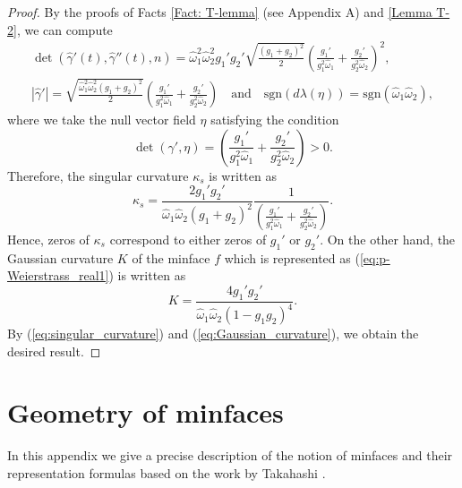 \documentclass[11pt,reqno]{amsart}
\theoremstyle{plain} %
\theoremstyle{definition}
\begin{document}
\begin{proof}
By the proofs of Facts \ref{Fact: T-lemma} (see Appendix A) and \ref{Lemma T-2}, we can compute
\begin{align}
\det(\hat{\gamma}'(t),\hat{\gamma}''(t),n)=\hat{\omega}_1^2\hat{\omega}_2^2g_1'g_2'\sqrt{\frac{(g_1+g_2)^2}{2}} \left(\frac{g_1'}{g_1^2\hat{\omega}_1}+\frac{g_2'}{g_2^2\hat{\omega}_2}\right)^2, \nonumber \\
|\hat{\gamma}'|=\sqrt{\frac{\hat{\omega}_1^2\hat{\omega}_2^2(g_1+g_2)^2}{2}}\left(\frac{g_1'}{g_1^2\hat{\omega}_1}+\frac{g_2'}{g_2^2\hat{\omega}_2}\right)\quad \text{and}\quad \mathrm{sgn}(d\lambda(\eta))=\mathrm{sgn}(\hat{\omega}_1\hat{\omega}_2),\nonumber
\end{align}
where we take the null vector field $\eta$ satisfying the condition
\begin{equation*}
\det(\gamma',\eta)=\left(\frac{g_1'}{g_1^2\hat{\omega}_1}+\frac{g_2'}{g_2^2\hat{\omega}_2}\right) >0.
\end{equation*}
Therefore, the singular curvature $\kappa_s$ is written as 
\begin{equation}\label{eq:singular_curvature}
\kappa_s=\frac{2g_1'g_2'}{\hat{\omega}_1\hat{\omega}_2(g_1+g_2)^2}\frac{1}{\left(\frac{g_1'}{g_1^2\hat{\omega}_1}+\frac{g_2'}{g_2^2\hat{\omega}_2}\right)}.
\end{equation}
Hence, zeros of $\kappa_s$ correspond to either zeros of $g_1'$ or $g_2'$. On the other hand, the Gaussian curvature $K$ of the minface $f$ which is represented as (\ref{eq:p-Weierstrass_real1}) is written as
\begin{equation}\label{eq:Gaussian_curvature}
K=\frac{4g_1'g_2'}{\hat{\omega}_1\hat{\omega}_2(1-g_1g_2)^4}.
\end{equation}
By (\ref{eq:singular_curvature}) and (\ref{eq:Gaussian_curvature}), we obtain the desired result.
\end{proof}


  \renewcommand{\theequation}{A.\arabic{equation}}
\setcounter{equation}{0}
\appendix
\section{Geometry of minfaces}\label{Appendix:A}
In this appendix we give a precise description of the notion of minfaces and their representation formulas based on the work by Takahashi \cite{T}.
\end{document}
